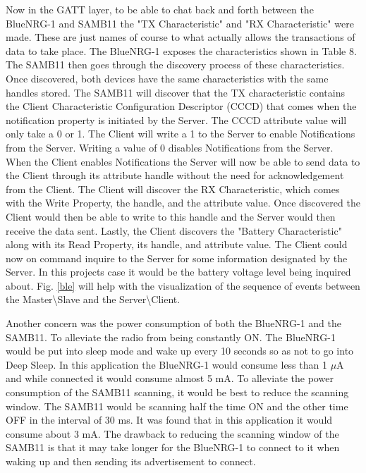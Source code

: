 \documentclass[journal,compsoc]{IEEEtran}
\begin{document}
Now in the GATT layer, to be able to chat back and forth between the BlueNRG-1 and SAMB11 the "TX Characteristic" and "RX Characteristic" were made. These are just names of course to what actually allows the transactions of data to take place. The BlueNRG-1 exposes the characteristics shown in Table 8. The SAMB11 then goes through the discovery process of these characteristics. Once discovered, both devices have the same characteristics with the same handles stored. The SAMB11 will discover that the TX characteristic contains the Client Characteristic Configuration Descriptor (CCCD) that comes when the notification property is initiated by the Server. The CCCD attribute value will only take a 0 or 1. The Client will write a 1 to the Server to enable Notifications from the Server. Writing a value of 0 disables Notifications from the Server. When the Client enables Notifications the Server will now be able to send data to the Client through its attribute handle without the need for acknowledgement from the Client. The Client will discover the RX Characteristic, which comes with the Write Property, the handle, and the attribute value. Once discovered the Client would then be able to write to this handle and the Server would then receive the data sent. Lastly, the Client discovers the "Battery Characteristic" along with its Read Property, its handle, and attribute value. The Client could now on command inquire to the Server for some information designated by the Server. In this projects case it would be the battery voltage level being inquired about. Fig. \ref{ble} will help with the visualization of the sequence of events between the Master\textbackslash Slave and the Server\textbackslash Client.

Another concern was the power consumption of both the BlueNRG-1 and the SAMB11. To alleviate the radio from being constantly ON. The BlueNRG-1 would be put into sleep mode and wake up every 10 seconds so as not to go into Deep Sleep. In this application the BlueNRG-1 would consume less than 1 $\mu$A and while connected it would consume almost 5 mA. To alleviate the power consumption of the SAMB11 scanning, it would be best to reduce the scanning window. The SAMB11 would be scanning half the time ON and the other time OFF in the interval of 30 ms. It was found that in this application it would consume about 3 mA. The drawback to reducing the scanning window of the SAMB11 is that it may take longer for the BlueNRG-1 to connect to it when waking up and then sending its advertisement to connect.
\end{document}
